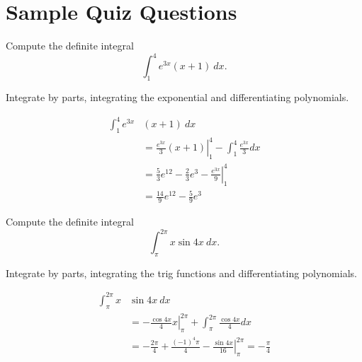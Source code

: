 \documentclass{ximera}
\begin{document}
\section*{Sample Quiz Questions}
\begin{question}%

Compute the definite integral 
\[\int_1^4 e^{3x} (x + 1) ~ dx.\]
\begin{multiplechoice}
\end{multiplechoice}
\begin{feedback}
Integrate by parts, integrating the exponential and differentiating polynomials.
\begin{hint}
\[\begin{aligned}
    \int_1^4 e^{3x} &  (x + 1) ~ dx \\
    & = \left. \frac{e^{3x}}{3} (x+1) \right|_1^4 - \int_1^4 \frac{e^{3x}}{3} dx \\
    & = \frac{5}{3} e^{12} - \frac{2}{3} e^{3} - \left. \frac{e^{3x}}{9} \right|_1^4 \\
    & = \frac{14}{9} e^{12} - \frac{5}{9} e^{3}
\end{aligned}\]
\end{hint}
\end{feedback}

\end{question}
\begin{question}%

Compute the definite integral 
\[\int_{\pi}^{2 \pi} x \sin 4 x ~ dx.\]
\begin{multiplechoice}
\end{multiplechoice}
\begin{feedback}
Integrate by parts, integrating the trig functions and differentiating polynomials.
\begin{hint}
\[ \begin{aligned}
    \int_{\pi}^{2 \pi} x & \sin 4 x ~ dx \\
    & = \left. - \frac{\cos 4x}{4} x \right|_{\pi}^{2 \pi} + \int_{\pi}^{2 \pi} \frac{\cos 4x}{4} dx \\
    & = - \frac{2 \pi }{4} + \frac{(-1)^{4} \pi }{4} - \left. \frac{\sin 4x}{16} \right|_{\pi}^{2 \pi} = -\frac{\pi}{4}
\end{aligned}\]
\end{hint}
\end{feedback}

\end{question}
\end{document}
